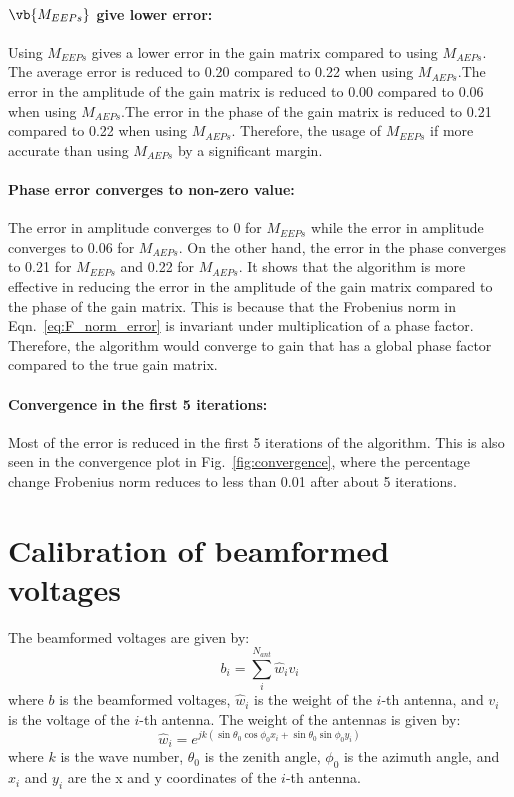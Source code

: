 \documentclass[10pt,a4paper,twocolumn]{article}
\begin{document}
\paragraph*{$\vb{{M}_{EEPs}}$ give lower error:}Using $M_{EEPs}$ gives a lower error in the gain matrix compared to using $M_{AEPs}$. The average error is reduced to 0.20 compared to 0.22 when using $M_{AEPs}$.The error in the amplitude of the gain matrix is reduced to 0.00 compared to 0.06 when using $M_{AEPs}$.The error in the phase of the gain matrix is reduced to 0.21 compared to 0.22 when using $M_{AEPs}.$
Therefore, the usage of $M_{EEPs}$ if more accurate than using $M_{AEPs}$ by a significant margin.

\paragraph*{Phase error converges to non-zero value:}
The error in amplitude converges to 0 for $M_{EEPs}$ while the error in amplitude converges to 0.06 for $M_{AEPs}$. On the other hand, the error in the phase converges to 0.21 for $M_{EEPs}$ and 0.22 for $M_{AEPs}$.
It shows that the algorithm is more effective in reducing the error in the amplitude of the gain matrix compared to the phase of the gain matrix. This is because that the Frobenius norm in Eqn.~\ref{eq:F_norm_error} is invariant under multiplication of a phase factor. Therefore, the algorithm would converge to gain that has a global phase factor compared to the true gain matrix.

\paragraph*{Convergence in the first 5 iterations:}
Most of the error is reduced in the first 5 iterations of the algorithm. This is also seen in the convergence plot in Fig.~\ref{fig:convergence}, where the percentage change Frobenius norm reduces to less than 0.01 after about 5 iterations.

\section{Calibration of beamformed voltages}
The beamformed voltages are given by:
\begin{equation}
    b_i = \sum_{i}^{N_{ant}} \hat{w}_i v_i
    \label{eq:beamformed_voltages}
\end{equation}
where $b$ is the beamformed voltages, $\hat{w}_i$ is the weight of the $i$-th antenna, and $v_i$ is the voltage of the $i$-th antenna.
The weight of the antennas is given by:
\begin{equation}
    \hat{w}_i = e^{jk(\sin\theta_0 \cos\phi_0 x_i + \sin\theta_0 \sin\phi_0 y_i)}
    \label{eq:weight}
\end{equation}
where $k$ is the wave number, $\theta_0$ is the zenith angle, $\phi_0$ is the azimuth angle, and $x_i$ and $y_i$ are the x and y coordinates of the $i$-th antenna.
\end{document}
